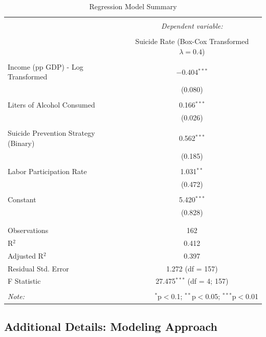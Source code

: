 \documentclass[]{article}
\begin{document}
\begin{table}[H] \centering 
  \caption {Regression Model Summary} 
  \label{tab:title} 
\begin{tabular}{@{\extracolsep{5pt}}lc} 
\\[-1.8ex]\hline 
\hline \\[-1.8ex] 
 & \multicolumn{1}{c}{\textit{Dependent variable:}} \\ 
\cline{2-2} 
\\[-1.8ex] & Suicide Rate (Box-Cox Transformed $\lambda = 0.4$) \\ 
\hline \\[-1.8ex] 
 Income (pp GDP) - Log Transformed & $-$0.404$^{***}$ \\ 
  & (0.080) \\ 
  & \\ 
Liters of Alcohol Consumed & 0.166$^{***}$ \\ 
  & (0.026) \\ 
  & \\ 
Suicide Prevention Strategy (Binary) & 0.562$^{***}$ \\ 
  & (0.185) \\ 
  & \\ 
Labor Participation Rate & 1.031$^{**}$ \\ 
  & (0.472) \\ 
  & \\ 
 Constant & 5.420$^{***}$ \\ 
  & (0.828) \\ 
  & \\ 
\hline \\[-1.8ex] 
Observations & 162 \\ 
R$^{2}$ & 0.412 \\ 
Adjusted R$^{2}$ & 0.397 \\ 
Residual Std. Error & 1.272 (df = 157) \\ 
F Statistic & 27.475$^{***}$ (df = 4; 157) \\ 
\hline 
\hline \\[-1.8ex] 
\textit{Note:}  & \multicolumn{1}{r}{$^{*}$p$<$0.1; $^{**}$p$<$0.05; $^{***}$p$<$0.01} \\ 
\end{tabular} 
\end{table}

\newpage

\subsection{Additional Details: Modeling
Approach}\label{additional-details-modeling-approach}
\end{document}
